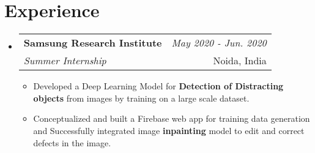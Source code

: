 \documentclass[a4paper,11pt]{article}
\makeatletter
\newcommand{\resumeSubheading}[4]{
\vspace{0.5mm}\item
    \begin{tabular*}{0.98\textwidth}[t]{l@{\extracolsep{\fill}}r}
        \textbf{#1} & \textit{\footnotesize{#4}} \\
        \textit{\footnotesize{#3}} &  \footnotesize{#2}\\
    \end{tabular*}
    \vspace{-2.4mm}
}
\newcommand{\resumeSubHeadingListStart}{\begin{itemize}[leftmargin=*,labelsep=0mm]}
\newcommand{\resumeItemListStart}{\begin{justify}\begin{itemize}[leftmargin=3ex, rightmargin=2ex, noitemsep,labelsep=1.2mm,itemsep=0mm]\small}
\newcommand{\resumeSubHeadingListEnd}{\end{itemize}\vspace{2mm}}
\newcommand{\resumeItemListEnd}{\end{itemize}\end{justify}\vspace{-2mm}}
\makeatother
\begin{document}
\section{\textbf{Experience}}
  \resumeSubHeadingListStart
  \vspace{-1mm}
    \resumeSubheading
      {Samsung Research Institute}{Noida, India}
      {Summer Internship}{May 2020 - Jun. 2020}
      \resumeItemListStart
    \item {Developed a Deep Learning Model for \textbf{Detection of Distracting objects} from images by training on a large scale dataset.}
    \item {Conceptualized and built a Firebase web app for training data generation and Successfully integrated image \textbf{inpainting} model to edit and correct defects in the image.}
    \resumeItemListEnd
    
      
  \resumeSubHeadingListEnd
\vspace{-7mm}
\end{document}
